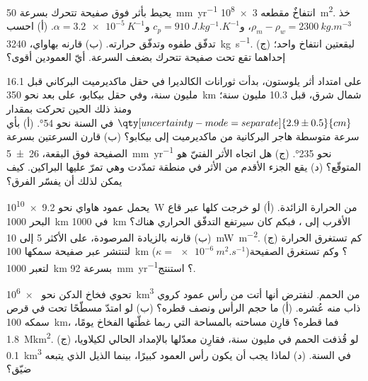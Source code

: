 \begin{exercise}[$\star\star$]\label{exo:b1:hotspots:7}
يحيط بأثر  فوق صفيحة تتحرك بسرعة \qty{50}{mm.yr^{-1}} انتفاخٌ مقطعه \qty{3e8}{m^2}. خذ $\rho_m - \rho_w = \qty{2300}{kg.m^{-3}}$، و$c_p = \qty{910}{J.kg^{-1}.K^{-1}}$ و$\alpha = \qty{3.2e-5}{K^{-1}}$. (أ) احسب تدفّق طفوه وتدفّق حرارته. (ب) قارنه بهاواي، \qty{3240}{kg.s^{-1}}. (ج) لبقعتين انتفاخ واحد؛ إحداهما تقع تحت صفيحة تتحرك بضعف السرعة. أيّ العمودين أقوى؟
\end{exercise}

\begin{exercise}[$\star\star$]\label{exo:b1:hotspots:8}
على امتداد أثر يلوستون، بدأت ثورانات الكالديرا في حقل ماكديرميت البركاني قبل 16.1 مليون سنة، وفي حقل بيكابو، على بعد نحو \qty{350}{km} شمال شرق، قبل 10.3 مليون سنة؛ ومنذ ذلك الحين تحركت بمقدار $\qty[uncertainty-mode=separate]{2.9 \pm 0.5}{cm}$ في السنة نحو  \ang{54}. (أ) بأي سرعة متوسطة هاجر البركانية من ماكديرميت إلى بيكابو؟ (ب) قارن السرعتين بسرعة الصفيحة فوق البقعة، \qty[uncertainty-mode=separate]{26 \pm 5}{mm.yr^{-1}} نحو \ang{235}. (ج) هل اتجاه الأثر الفتيّ هو المتوقّع؟ (د) يقع الجزء الأقدم من الأثر في منطقة تمدّدت وهي تمرّ عليها البراكين. كيف يمكن لذلك أن يفسّر الفرق؟
\end{exercise}

\begin{exercise}[$\star\star$]\label{exo:b1:hotspots:9}
يحمل عمود هاواي نحو \qty{9.2e10}{W} من الحرارة الزائدة. (أ) لو خرجت كلها عبر قاع البحر \qty{1000}{km} في \qty{1000}{km} الأقرب إلى ، فبكم كان سيرتفع التدفّق الحراري هناك؟ (ب) قارنه بالزيادة المرصودة، على الأكثر 5 إلى \qty{10}{mW.m^{-2}}. (ج) كم تستغرق الحرارة لتنتشر عبر صفيحة سمكها \qty{100}{km} ($\kappa = \qty{e-6}{m^2.s^{-1}}$)؟ وكم تستغرق الصفيحة لتعبر \qty{1000}{km} بسرعة \qty{92}{mm.yr^{-1}}؟ استنتج.
\end{exercise}

\begin{exercise}[$\star\star\star$]\label{exo:b1:hotspots:10}
تحوي فخاخ الدكن نحو \qty{e6}{km^3} من الحمم. لنفترض أنها أتت من رأس عمود كروي ذاب منه عُشره. (أ) ما حجم الرأس ونصف قطره؟ (ب) لو امتدّ مسطّحًا تحت  في قرص سمكه \qty{100}{km}، فما قطره؟ قارِن مساحته بالمساحة التي ربما غطّتها الفخاخ يومًا، \qty{1.8}{\mega km^2}. (ج) لو قُذفت الحمم في مليون سنة، فقارِن معدّلها بالإمداد الحالي لكيلاويا، \qty{0.1}{km^3} في السنة. (د) لماذا يجب أن يكون رأس العمود كبيرًا، بينما الذيل الذي يتبعه ضيّق؟
\end{exercise}

